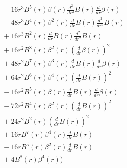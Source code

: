 \documentclass[11pt,a4paper]{article}
\begin{document}
\begin{tcolorbox}[colback=boxblue,colframe=black!40,title=\textbf{Kretschmann scalar},breakable]
\begin{align*}
  &\quad - 16 r^{3} B^{5}{\left(r \right)} \beta{\left(r \right)} \frac{d^{2}}{d r^{2}} B{\left(r \right)} \frac{d}{d r} \beta{\left(r \right)} \\
  &\quad - 48 r^{3} B^{4}{\left(r \right)} \beta^{2}{\left(r \right)} \frac{d}{d r} B{\left(r \right)} \frac{d^{2}}{d r^{2}} B{\left(r \right)} \\
  &\quad + 16 r^{3} B^{2}{\left(r \right)} \frac{d}{d r} B{\left(r \right)} \frac{d^{2}}{d r^{2}} B{\left(r \right)} \\
  &\quad + 16 r^{2} B^{8}{\left(r \right)} \beta^{2}{\left(r \right)} \left(\frac{d}{d r} \beta{\left(r \right)}\right)^{2} \\
  &\quad + 48 r^{2} B^{7}{\left(r \right)} \beta^{3}{\left(r \right)} \frac{d}{d r} B{\left(r \right)} \frac{d}{d r} \beta{\left(r \right)} \\
  &\quad + 64 r^{2} B^{6}{\left(r \right)} \beta^{4}{\left(r \right)} \left(\frac{d}{d r} B{\left(r \right)}\right)^{2} \\
  &\quad - 16 r^{2} B^{5}{\left(r \right)} \beta{\left(r \right)} \frac{d}{d r} B{\left(r \right)} \frac{d}{d r} \beta{\left(r \right)} \\
  &\quad - 72 r^{2} B^{4}{\left(r \right)} \beta^{2}{\left(r \right)} \left(\frac{d}{d r} B{\left(r \right)}\right)^{2} \\
  &\quad + 24 r^{2} B^{2}{\left(r \right)} \left(\frac{d}{d r} B{\left(r \right)}\right)^{2} \\
  &\quad + 16 r B^{7}{\left(r \right)} \beta^{4}{\left(r \right)} \frac{d}{d r} B{\left(r \right)} \\
  &\quad - 16 r B^{5}{\left(r \right)} \beta^{2}{\left(r \right)} \frac{d}{d r} B{\left(r \right)} \\
  &\quad + 4 B^{8}{\left(r \right)} \beta^{4}{\left(r \right)}\Bigr)
\end{align*}
\end{tcolorbox}
\end{document}
